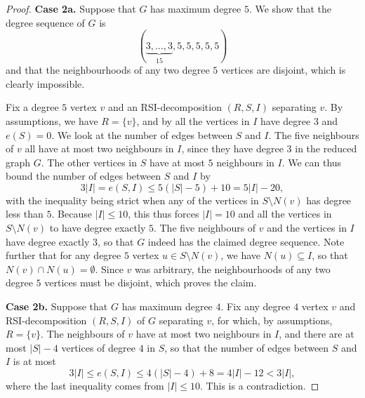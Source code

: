 \documentclass[a4paper,11pt,oneside]{scrartcl}
\theoremstyle{definition}
\theoremstyle{remark}
\begin{document}
\begin{proof}
    \textbf{Case 2a. } Suppose that $G$ has maximum degree $5$. We show that the degree sequence of $G$ is
    \[
        (\underbrace{3,\dots,3}_{15},5,5,5,5,5)
    \]
    and that the neighbourhoods of any two degree $5$ vertices are disjoint, which is clearly impossible.

    Fix a degree $5$ vertex $v$ and an RSI-decomposition $(R,S,I)$ separating $v$. By assumptions, we have $R = \{v\}$, and by  all the vertices in $I$ have degree $3$ and $e(S) = 0$. We look at the number of edges between $S$ and $I$. The five neighbours of $v$ all have at most two neighbours in $I$, since they have degree $3$ in the reduced graph $G$. The other vertices in $S$ have at most $5$ neighbours in $I$. We can thus bound the number of edges between $S$ and $I$ by
    \[
        3|I| =  e(S,I) \leq 5(|S|-5) + 10 = 5|I| - 20,
    \]
    with the inequality being strict when any of the vertices in $S \setminus N(v)$ has degree less than $5$. Because $|I| \leq 10$, this thus forces $|I| = 10$ and all the vertices in $S \setminus N(v)$ to have degree exactly $5$. The five neighbours of $v$ and the vertices in $I$ have degree exactly $3$, so that $G$ indeed has the claimed degree sequence. Note further that for any degree $5$ vertex $u\in S\setminus N(v)$, we have $N(u) \subseteq I$, so that $N(v) \cap N(u) = \emptyset$. Since $v$ was arbitrary, the neighbourhoods of any two degree $5$ vertices must be disjoint, which proves the claim.

    \textbf{Case 2b. } Suppose that $G$ has maximum degree $4$. Fix any degree $4$ vertex $v$ and RSI-decomposition $(R,S,I)$ of $G$ separating $v$, for which, by assumptions, $R = \{v\}$. The neighbours of $v$ have at most two neighbours in $I$, and there are at most $|S|-4$ vertices of degree $4$ in $S$, so that the number of edges between $S$ and $I$ is at most
    \[3|I| \leq e(S,I) \leq 4(|S|-4) + 8 = 4|I|-12 < 3|I|,\]
    where the last inequality comes from $|I| \leq 10$. This is a contradiction.
\end{proof}
\end{document}
